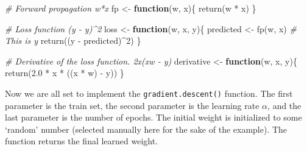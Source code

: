 \documentclass[
  11pt,
]{krantz}
\newenvironment{Shaded}{\begin{snugshade}}{\end{snugshade}}
\newcommand{\CommentTok}[1]{\textcolor[rgb]{0.37,0.37,0.37}{\textit{#1}}}
\newcommand{\ControlFlowTok}[1]{\textcolor[rgb]{0.27,0.27,0.27}{\textbf{#1}}}
\newcommand{\DecValTok}[1]{\textcolor[rgb]{0.06,0.06,0.06}{#1}}
\newcommand{\FloatTok}[1]{\textcolor[rgb]{0.06,0.06,0.06}{#1}}
\newcommand{\FunctionTok}[1]{\textcolor[rgb]{0,0,0}{#1}}
\newcommand{\NormalTok}[1]{#1}
\newcommand{\OtherTok}[1]{\textcolor[rgb]{0.37,0.37,0.37}{#1}}
\newcommand{\SpecialCharTok}[1]{\textcolor[rgb]{0,0,0}{#1}}
\begin{document}
\begin{Shaded}
\begin{Highlighting}[]
\CommentTok{\# Forward propagation w*x}
\NormalTok{fp }\OtherTok{\textless{}{-}} \ControlFlowTok{function}\NormalTok{(w, x)\{}
    \FunctionTok{return}\NormalTok{(w }\SpecialCharTok{*}\NormalTok{ x)}
\NormalTok{\}}

\CommentTok{\# Loss function (y {-} y\textquotesingle{})\^{}2}
\NormalTok{loss }\OtherTok{\textless{}{-}} \ControlFlowTok{function}\NormalTok{(w, x, y)\{}
\NormalTok{  predicted }\OtherTok{\textless{}{-}} \FunctionTok{fp}\NormalTok{(w, x) }\CommentTok{\# This is y\textquotesingle{}}
  \FunctionTok{return}\NormalTok{((y }\SpecialCharTok{{-}}\NormalTok{ predicted)}\SpecialCharTok{\^{}}\DecValTok{2}\NormalTok{)}
\NormalTok{\}}

\CommentTok{\# Derivative of the loss function. 2x(xw {-} y)}
\NormalTok{derivative }\OtherTok{\textless{}{-}} \ControlFlowTok{function}\NormalTok{(w, x, y)\{}
  \FunctionTok{return}\NormalTok{(}\FloatTok{2.0} \SpecialCharTok{*}\NormalTok{ x }\SpecialCharTok{*}\NormalTok{ ((x }\SpecialCharTok{*}\NormalTok{ w) }\SpecialCharTok{{-}}\NormalTok{ y))}
\NormalTok{\}}
\end{Highlighting}
\end{Shaded}

Now we are all set to implement the \texttt{gradient.descent()} function. The first parameter is the train set, the second parameter is the learning rate \(\alpha\), and the last parameter is the number of epochs. The initial weight is initialized to some `random' number (selected manually here for the sake of the example). The function returns the final learned weight.
\end{document}
